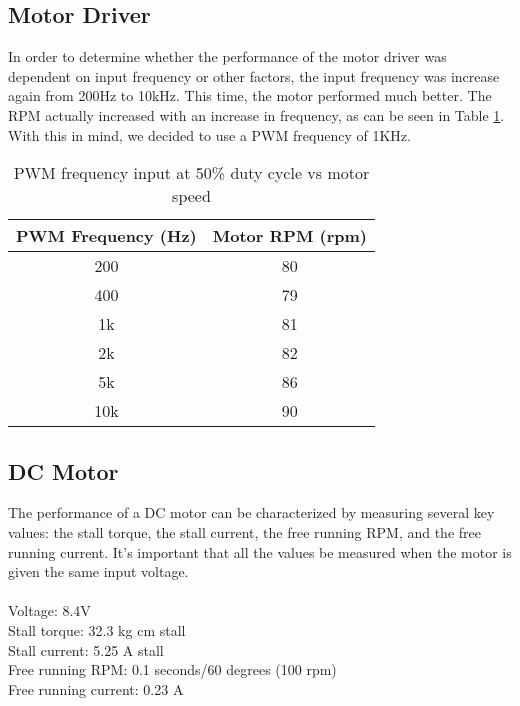 \subsection{Motor Driver}
In order to determine whether the performance of the motor driver was dependent on input frequency or other factors, the input frequency was increase again from 200Hz to 10kHz. This time, the motor performed much better. The RPM actually increased with an increase in frequency, as can be seen in Table \ref{tbl:freq-test}. With this in mind, we decided to use a PWM frequency of 1KHz.
\begin{table}[H]
	\centering
	\caption{PWM frequency input at 50\% duty cycle vs motor speed}
	\begin{tabular}{| c | c |}
		\hline
		PWM Frequency (Hz) & Motor RPM (rpm) \\
		\hline
		200 & 80 \\
		400 & 79 \\
		1k & 81 \\
		2k & 82 \\
		5k & 86 \\
		10k & 90 \\
		\hline
	\end{tabular}
	\label{tbl:freq-test}
\end{table}

\subsection{DC Motor}

The performance of a DC motor can be characterized by measuring several key values: the stall torque, the stall current, the free running RPM, and the free running current. It's important that all the values be measured when the motor is given the same input voltage.\\
\\
\noindent
Voltage: 8.4V \\
Stall torque: 32.3 kg cm stall \\
Stall current: 5.25 A stall \\
Free running RPM: 0.1 seconds/60 degrees (100 rpm) \\
Free running current: 0.23 A \\



